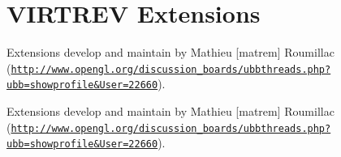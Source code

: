 \hypertarget{group__virtrev}{}\section{V\+I\+R\+T\+R\+EV Extensions}
\label{group__virtrev}


Extensions develop and maintain by Mathieu \mbox{[}matrem\mbox{]} Roumillac (\href{http://www.opengl.org/discussion_boards/ubbthreads.php?ubb=showprofile&User=22660}{\tt http\+://www.\+opengl.\+org/discussion\+\_\+boards/ubbthreads.\+php?ubb=showprofile\&\+User=22660}).  


Extensions develop and maintain by Mathieu \mbox{[}matrem\mbox{]} Roumillac (\href{http://www.opengl.org/discussion_boards/ubbthreads.php?ubb=showprofile&User=22660}{\tt http\+://www.\+opengl.\+org/discussion\+\_\+boards/ubbthreads.\+php?ubb=showprofile\&\+User=22660}). 


